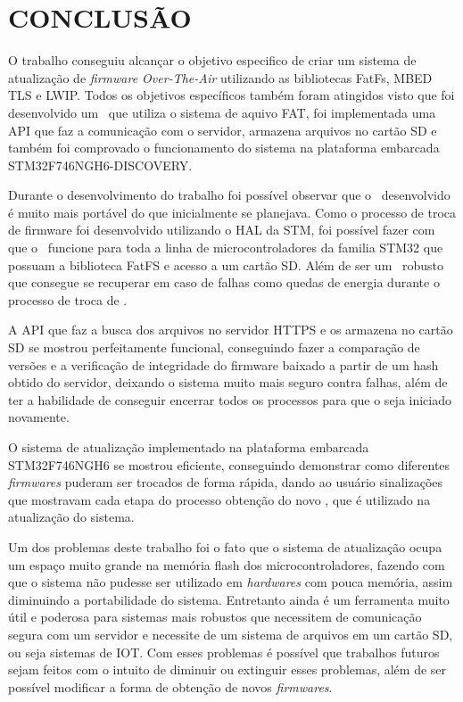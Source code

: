 
\chapter{CONCLUSÃO}
\label{chap:conclusao}
O trabalho conseguiu alcançar o objetivo especifico de criar um sistema de atualização de \textit{firmware Over-The-Air} utilizando as bibliotecas FatFs, MBED TLS e LWIP. Todos os objetivos específicos também foram atingidos visto que foi desenvolvido um \bootloader\ que utiliza o sistema de aquivo FAT, foi implementada uma API que faz a comunicação com o servidor, armazena arquivos no cartão SD e também foi comprovado o funcionamento do sistema na plataforma embarcada STM32F746NGH6-DISCOVERY.

Durante o desenvolvimento do trabalho foi possível observar que o \bootloader\ desenvolvido é muito mais portável do que inicialmente se planejava. Como o processo de troca de firmware foi desenvolvido utilizando o HAL da STM, foi possível fazer com que o \bootloader\ funcione para toda a linha de microcontroladores da familia STM32 que possuam a biblioteca FatFS e acesso a um cartão SD. Além de ser um \bootloader\ robusto que consegue se recuperar em caso de falhas como quedas de energia durante o processo de troca de \firmware.

A API que faz a busca dos arquivos no servidor HTTPS e os armazena no cartão SD se mostrou perfeitamente funcional, conseguindo fazer a comparação de versões e a verificação de integridade do firmware baixado a partir de um hash obtido do servidor, deixando o sistema muito mais seguro contra falhas, além de ter a habilidade de conseguir encerrar todos os processos para que o \bootloader seja iniciado novamente.


O sistema de atualização implementado na plataforma embarcada STM32F746NGH6 se mostrou eficiente, conseguindo demonstrar como diferentes \textit{firmwares} puderam ser trocados de forma rápida, dando ao usuário sinalizações que mostravam cada etapa do processo obtenção do novo \firmware, que é utilizado na atualização do sistema.

Um dos problemas deste trabalho foi o fato que o sistema de atualização ocupa um espaço muito grande na memória flash dos microcontroladores, fazendo com que o sistema não pudesse ser utilizado em \textit{hardwares} com pouca memória, assim diminuindo a portabilidade do sistema. Entretanto ainda é um ferramenta muito útil e poderosa para sistemas mais robustos que necessitem de comunicação segura com um servidor e necessite de um sistema de arquivos em um cartão SD, ou seja sistemas de IOT. Com esses problemas é possível que trabalhos futuros sejam feitos com o intuito de diminuir ou extinguir esses problemas, além de ser possível modificar a forma de obtenção de novos \textit{firmwares}.

